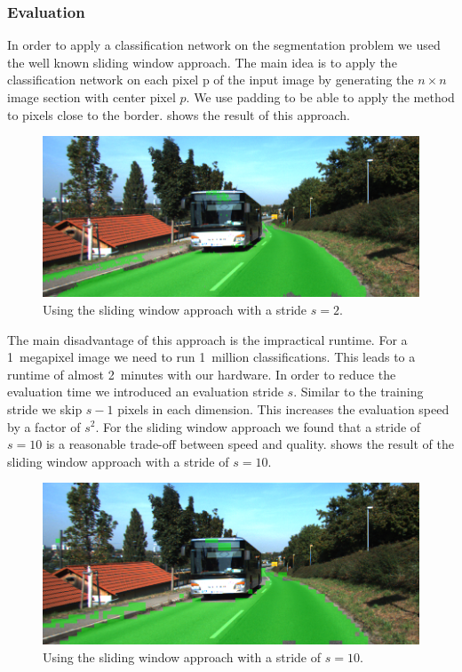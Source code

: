 \subsubsection{Evaluation}

In order to apply a classification network on the segmentation problem we used the well known sliding window approach. The main idea is to apply the classification network on each pixel p of the input image by generating the $n \times n$ image section with center pixel $p$. We use padding to be able to apply the method to pixels close to the border.  shows the result of this approach.

\begin{figure}[H]
	\centering
	\includegraphics[width=\columnwidth]{figures/models/testing2-um_32_sliding_stride2.png}
	\caption{Using the sliding window approach with a stride $s=2$.}
	\label{fig:stride2}
\end{figure}

The main disadvantage of this approach is the impractical runtime. For a 1~megapixel image we need to run 1~million classifications. This leads to a runtime of almost 2~minutes with our hardware. In order to reduce the evaluation time we introduced an evaluation stride $s$. Similar to the training stride we skip $s-1$ pixels in each dimension. This increases the evaluation speed by a factor of $s^2$. For the sliding window approach we found that a stride of $s = 10$ is a reasonable trade-off between speed and quality.  shows the result of the sliding window approach with a stride of $s=10$.



\begin{figure}[H]
	\centering
	\includegraphics[width=\columnwidth]{figures/models/testing2-um_32_sliding_stride10.png}
	\caption{Using the sliding window approach with a stride of $s=10$.}
	\label{fig:stride10}
\end{figure}


